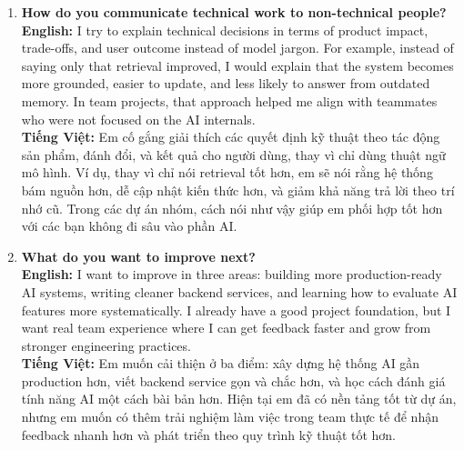 \documentclass[11pt,a4paper]{article}
\begin{document}
\begin{enumerate}[leftmargin=*, itemsep=10pt]
\item \textbf{How do you communicate technical work to non-technical people?}\\
\textbf{English:} I try to explain technical decisions in terms of product impact, trade-offs, and user outcome instead of model jargon. For example, instead of saying only that retrieval improved, I would explain that the system becomes more grounded, easier to update, and less likely to answer from outdated memory. In team projects, that approach helped me align with teammates who were not focused on the AI internals.\\
\textbf{Tiếng Việt:} Em cố gắng giải thích các quyết định kỹ thuật theo tác động sản phẩm, đánh đổi, và kết quả cho người dùng, thay vì chỉ dùng thuật ngữ mô hình. Ví dụ, thay vì chỉ nói retrieval tốt hơn, em sẽ nói rằng hệ thống bám nguồn hơn, dễ cập nhật kiến thức hơn, và giảm khả năng trả lời theo trí nhớ cũ. Trong các dự án nhóm, cách nói như vậy giúp em phối hợp tốt hơn với các bạn không đi sâu vào phần AI.

\item \textbf{What do you want to improve next?}\\
\textbf{English:} I want to improve in three areas: building more production-ready AI systems, writing cleaner backend services, and learning how to evaluate AI features more systematically. I already have a good project foundation, but I want real team experience where I can get feedback faster and grow from stronger engineering practices.\\
\textbf{Tiếng Việt:} Em muốn cải thiện ở ba điểm: xây dựng hệ thống AI gần production hơn, viết backend service gọn và chắc hơn, và học cách đánh giá tính năng AI một cách bài bản hơn. Hiện tại em đã có nền tảng tốt từ dự án, nhưng em muốn có thêm trải nghiệm làm việc trong team thực tế để nhận feedback nhanh hơn và phát triển theo quy trình kỹ thuật tốt hơn.

\end{enumerate}
\end{document}
